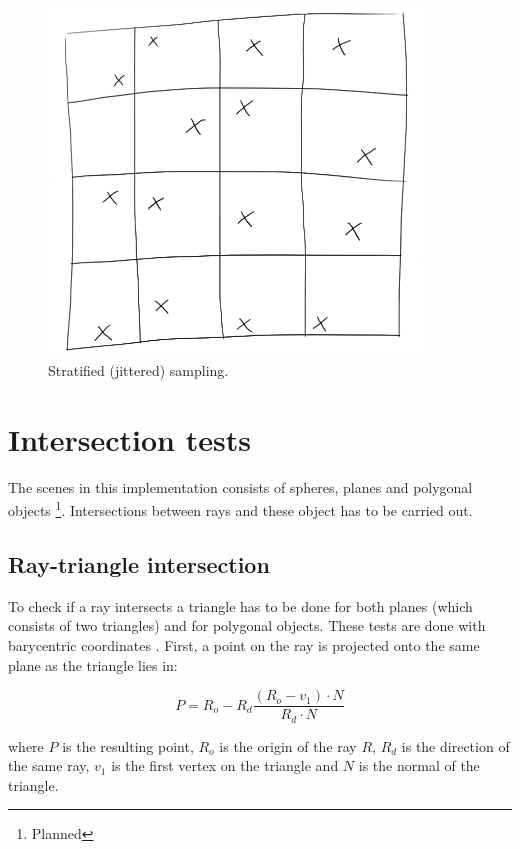 \documentclass[a4paper]{report}
\begin{document}
\begin{figure}
  \centering
  \includegraphics[width=10cm]{figures/1}
  \caption{Stratified (jittered) sampling.}
  \label{fig:jittered}
\end{figure}

\section{Intersection tests}

The scenes in this implementation consists of spheres, planes and
polygonal objects \footnote{Planned}. Intersections between rays and
these object has to be carried out.

\subsection{Ray-triangle intersection}

To check if a ray intersects a triangle has to be done for both planes
(which consists of two triangles) and for polygonal objects. These
tests are done with barycentric coordinates \cite{pointTest:10}. First, a point on the ray
is projected onto the same plane as the triangle lies in:

\begin{equation}
  P = R_o - R_d\frac{(R_o-v_1) \cdot N}{R_d \cdot N}
  \label{eq:planeproj}
\end{equation}

where \(P\) is the resulting point, \(R_o\) is the origin of the ray
\(R\), \(R_d\) is the direction of the same ray, \(v_1\) is the first
vertex on the triangle and \(N\) is the normal of the triangle.
\end{document}
